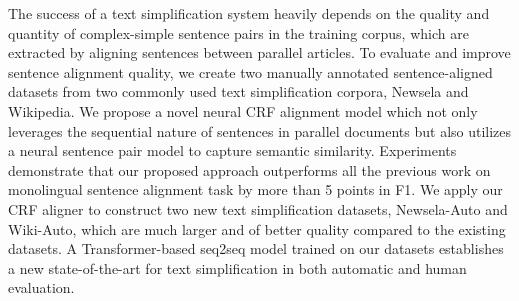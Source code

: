 The success of a text simplification system heavily depends on the quality and quantity of complex-simple sentence pairs in the training corpus, which are extracted by aligning sentences between parallel articles. To evaluate and improve sentence alignment quality, we create two manually annotated sentence-aligned datasets from two commonly used text simplification corpora, Newsela and Wikipedia. We propose a novel neural CRF alignment model which not only leverages the sequential nature of sentences in parallel documents but also utilizes a neural sentence pair model to capture semantic similarity. Experiments demonstrate that our proposed approach outperforms all the previous work on monolingual sentence alignment task by more than 5 points in F1. We apply our CRF aligner to construct two new text simplification datasets, {\sc Newsela-Auto} and {\sc Wiki-Auto}, which are much larger and of better quality compared to the existing datasets. A Transformer-based seq2seq model trained on our datasets establishes a new state-of-the-art for text simplification in both automatic and human evaluation.
